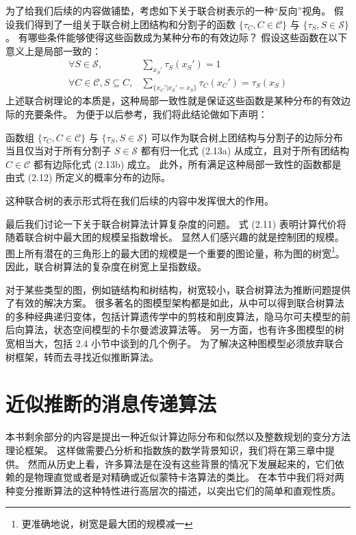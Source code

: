 为了给我们后续的内容做铺垫，考虑如下关于联合树表示的一种“反向”视角。
假设我们得到了一组关于联合树上团结构和分割子的函数 $\{\tau_C, C \in \mathcal{C}\}$ 与 $\{\tau_S, S \in \mathcal{S}\}$。
有哪些条件能够使得这些函数成为某种分布的有效边际？
假设这些函数在以下意义上是局部一致的：
\begin{subequations}
\begin{align}
    \forall S \in \mathcal{S}, &\sum_{x_S'}\tau_S(x_S') = 1 \\
    \forall C \in \mathcal{C}, S \subseteq C, &\sum_{\{x_C'|x_S' = x_S\}}\tau_C(x_C') = \tau_S(x_S)
\end{align}
\end{subequations}
上述联合树理论的本质是，这种局部一致性就是保证这些函数是某种分布的有效边际的充要条件。
为便于以后参考，我们将此结论做如下声明：
\begin{tcolorbox}
\begin{prop}
    函数组 $\{\tau_C, C \in \mathcal{C}\}$ 与 $\{\tau_S, S \in \mathcal{S}\}$ 可以作为联合树上团结构与分割子的边际分布当且仅当对于所有分割子 $S \in \mathcal{S}$ 都有归一化式 (2.13a) 从成立，且对于所有团结构 $C \in \mathcal{C}$ 都有边际化式 (2.13b) 成立。
    此外，所有满足这种局部一致性的函数都是由式 (2.12) 所定义的概率分布的边际。
\end{prop}
\end{tcolorbox}
这种联合树的表示形式将在我们后续的内容中发挥很大的作用。

最后我们讨论一下关于联合树算法计算复杂度的问题。
式 (2.11) 表明计算代价将随着联合树中最大团的规模呈指数增长。
显然人们感兴趣的就是控制团的规模。
图上所有潜在的三角形上的最大团的规模是一个重要的图论量，称为图的树宽\footnote{更准确地说，树宽是最大团的规模减一}。
因此，联合树算法的复杂度在树宽上呈指数级。

对于某些类型的图，例如链结构和树结构，树宽较小，联合树算法为推断问题提供了有效的解决方案。
很多著名的图模型架构都是如此，从中可以得到联合树算法的多种经典递归变体，包括计算遗传学中的剪枝和削皮算法，隐马尔可夫模型的前后向算法，状态空间模型的卡尔曼滤波算法等。
另一方面，也有许多图模型的树宽相当大，包括 2.4 小节中谈到的几个例子。
为了解决这种图模型必须放弃联合树框架，转而去寻找近似推断算法。

\section{近似推断的消息传递算法}

本书剩余部分的内容是提出一种近似计算边际分布和似然以及整数规划的变分方法理论框架。
这样做需要凸分析和指数族的数学背景知识，我们将在第三章中提供。
然而从历史上看，许多算法是在没有这些背景的情况下发展起来的，它们依赖的是物理直觉或者是对精确或近似蒙特卡洛算法的类比。
在本节中我们将对两种变分推断算法的这种特性进行高层次的描述，以突出它们的简单和直观性质。

